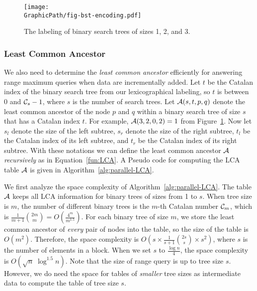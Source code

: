 \begin{figure}[!thb]
  \centering
  \texttt{[image: \\GraphicPath/fig-bst-encoding.pdf]}
  \caption{The labeling of binary search trees of sizes 1, 2, and 3.}
  \label{fig:labelingBST}
\end{figure}

\subsubsection{Least Common Ancestor}

We also need to determine the {\em least common ancestor} efficiently
for answering range maximum queries when data are incrementally added.
Let $t$ be the Catalan index of the binary search tree from our
lexicographical labeling, so $t$ is between 0 and ${\cal C}_s-1$, where
$s$ is the number of search trees.  Let ${\cal A}(s, t, p, q)$ denote
the least common ancestor of the node $p$ and $q$ within a binary search
tree of size $s$ that has a Catalan index $t$.  For example, ${\cal
A}(3, 2, 0, 2) = 1$ from Figure~\ref{fig:labelingBST}.  Now let $s_l$
denote the size of the left subtree, $s_r$ denote the size of the right
subtree, $t_l$ be the Catalan index of its left subtree, and $t_r$ be
the Catalan index of its right subtree.  With these notations we can
define the least common ancestor $\cal A$ {\em recursively} as in
Equation~\ref{fun:LCA}.  A Pseudo code for computing the LCA table $\cal
A$ is given in Algorithm~\ref{alg:parallel-LCA}.





We first analyze the space complexity of
Algorithm~\ref{alg:parallel-LCA}.  The table $\cal A$ keeps all LCA
information for binary trees of sizes from 1 to $s$.  When tree size is
$m$, the number of different binary trees is the $m$-th Catalan number
${\cal C}_m$, which is
$\frac{1}{m+1}\binom{2m}{m}=O(\frac{4^m}{m^{1.5}})$. For each binary
tree of size $m$, we store the least common ancestor of {\em every} pair
of nodes into the table, so the size of the table is $O(m^2)$.
Therefore, the space complexity is $O(s \times
\frac{1}{s+1}\binom{2s}{s} \times s^2)$, where $s$ is the number of
elements in a block.  When we set $s$ to $\frac{\log n}{4}$, the space
complexity is $O(\sqrt{n} \; \log ^{1.5} n)$.  Note that the size of
range query is up to tree size $s$.  However, we do need the space for
tables of {\em smaller} tree sizes as intermediate data to compute the
table of tree size $s$.

